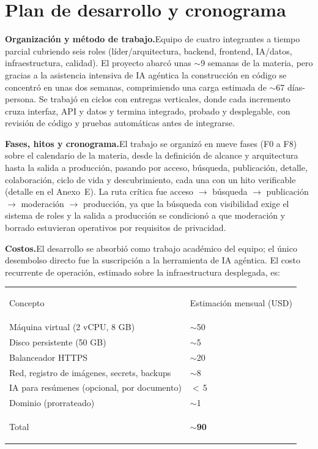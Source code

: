 \documentclass[12pt,a4paper]{article}
\newcommand{\thead}[1]{{\color{white}\bfseries\rule[-0.9ex]{0pt}{3.2ex}#1}}
\newcommand{\bodystrut}{\rule[-0.7ex]{0pt}{2.7ex}}
\begin{document}
\section{Plan de desarrollo y cronograma}

\noindent\textbf{Organización y método de trabajo.}\enspace Equipo de cuatro integrantes a tiempo parcial cubriendo seis roles (líder/arquitectura, backend, frontend, IA/datos, infraestructura, calidad). El proyecto abarcó unas $\sim$9 semanas de la materia, pero gracias a la asistencia intensiva de IA agéntica la construcción en código se concentró en unas dos semanas, comprimiendo una carga estimada de $\sim$67 días-persona. Se trabajó en ciclos con entregas verticales, donde cada incremento cruza interfaz, API y datos y termina integrado, probado y desplegable, con revisión de código y pruebas automáticas antes de integrarse.

\medskip
\noindent\textbf{Fases, hitos y cronograma.}\enspace El trabajo se organizó en nueve fases (F0 a F8) sobre el calendario de la materia, desde la definición de alcance y arquitectura hasta la salida a producción, pasando por acceso, búsqueda, publicación, detalle, colaboración, ciclo de vida y descubrimiento, cada una con un hito verificable (detalle en el Anexo~E). La ruta crítica fue acceso $\rightarrow$ búsqueda $\rightarrow$ publicación $\rightarrow$ moderación $\rightarrow$ producción, ya que la búsqueda con visibilidad exige el sistema de roles y la salida a producción se condicionó a que moderación y borrado estuvieran operativos por requisitos de privacidad.

\medskip
\noindent\textbf{Costos.}\enspace El desarrollo se absorbió como trabajo académico del equipo; el único desembolso directo fue la suscripción a la herramienta de IA agéntica. El costo recurrente de operación, estimado sobre la infraestructura desplegada, es:

\medskip
\noindent\begin{tabularx}{\linewidth}{L >{\Centering\arraybackslash}p{5cm}}
\thead{Concepto} & \thead{Estimación mensual (USD)} \\
Máquina virtual (2 vCPU, 8 GB) & $\sim$50 \\
Disco persistente (50 GB) & $\sim$5 \\
Balanceador HTTPS & $\sim$20 \\
Red, registro de imágenes, secrets, backups & $\sim$8 \\
IA para resúmenes (opcional, por documento) & $<$\,5 \\
Dominio (prorrateado) & $\sim$1 \\
\midrule
{}
{\bfseries\bodystrut Total} & \textbf{$\sim$90} \\
\bottomrule[\heavyrulewidth]
\end{tabularx}
\end{document}
